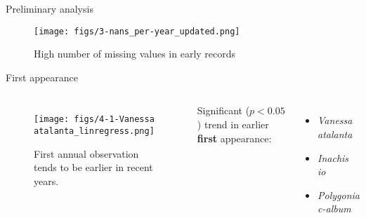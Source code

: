 \documentclass[english, xcolor=dvipsnames, 11pt]{beamer}
\begin{document}
	
	\begin{frame}{Preliminary analysis}
		\begin{figure}
			\centering
			\texttt{[image: figs/3-nans\_per-year\_updated.png]}
			\caption{High number of missing values in early records}
			\label{fig:missing-values}
		\end{figure}
	\end{frame}

	
	\begin{frame}{First appearance}
		\begin{columns}
			\begin{figure}
				\centering
				\texttt{[image: figs/4-1-Vanessa atalanta\_linregress.png]}
				\caption{First annual observation tends to be earlier in recent years.}
				\label{fig:first-app}
			\end{figure}
			Significant (\(p < 0.05\)) trend in earlier \textbf{first} appearance:
			\begin{itemize}
				\setlength\itemsep{-0.5em}
				\item \textit{Vanessa atalanta}
				\item \textit{Inachis io}
				\item \textit{Polygonia c-album}
			\end{itemize}
		\end{columns}
	\end{frame}

	
\end{document}
